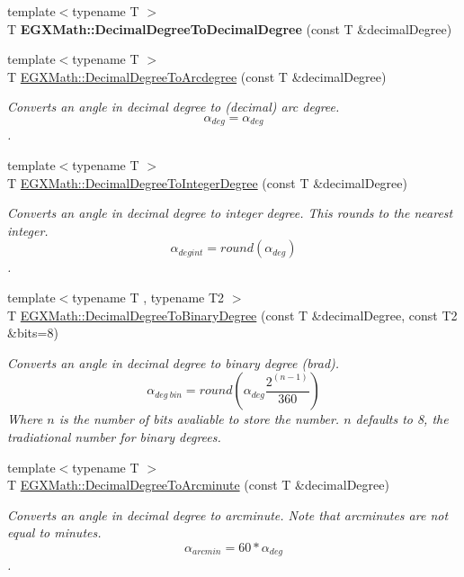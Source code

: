 \begin{DoxyCompactItemize}
{\footnotesize template$<$typename T $>$ }\\T {\bfseries E\+G\+X\+Math\+::\+Decimal\+Degree\+To\+Decimal\+Degree} (const T \&decimal\+Degree)
\item 
{\footnotesize template$<$typename T $>$ }\\T \mbox{\hyperlink{group___e_g_x_math-_angle_conversions-_decimal_degree_gacdd463fcabffeb598ebda65b012ce743}{E\+G\+X\+Math\+::\+Decimal\+Degree\+To\+Arcdegree}} (const T \&decimal\+Degree)
\begin{DoxyCompactList}\small\item\em Converts an angle in decimal degree to (decimal) arc degree. \[\alpha_{deg}=\alpha_{deg}\]. \end{DoxyCompactList}\item 
{\footnotesize template$<$typename T $>$ }\\T \mbox{\hyperlink{group___e_g_x_math-_angle_conversions-_decimal_degree_ga115239ea7202dbc6a6c9fba68e0ac189}{E\+G\+X\+Math\+::\+Decimal\+Degree\+To\+Integer\+Degree}} (const T \&decimal\+Degree)
\begin{DoxyCompactList}\small\item\em Converts an angle in decimal degree to integer degree. This rounds to the nearest integer. \[\alpha_{deg int}=round(\alpha_{deg})\]. \end{DoxyCompactList}\item 
{\footnotesize template$<$typename T , typename T2 $>$ }\\T \mbox{\hyperlink{group___e_g_x_math-_angle_conversions-_decimal_degree_gaceec7ae7988c7f342d0b0fa6940720a1}{E\+G\+X\+Math\+::\+Decimal\+Degree\+To\+Binary\+Degree}} (const T \&decimal\+Degree, const T2 \&bits=8)
\begin{DoxyCompactList}\small\item\em Converts an angle in decimal degree to binary degree (brad). \[\alpha_{deg\ bin}=round(\alpha_{deg}\frac{2^{(n-1)}}{360})\] Where $n$ is the number of bits avaliable to store the number. $n$ defaults to 8, the tradiational number for binary degrees. \end{DoxyCompactList}\item 
{\footnotesize template$<$typename T $>$ }\\T \mbox{\hyperlink{group___e_g_x_math-_angle_conversions-_decimal_degree_ga6b6ea6e45d2a13f556824ca419cc9fbd}{E\+G\+X\+Math\+::\+Decimal\+Degree\+To\+Arcminute}} (const T \&decimal\+Degree)
\begin{DoxyCompactList}\small\item\em Converts an angle in decimal degree to arcminute. Note that arcminutes are not equal to minutes. \[\alpha_{arcmin}= 60 * \alpha_{deg}\]. \end{DoxyCompactList}\item 

\end{DoxyCompactItemize}
